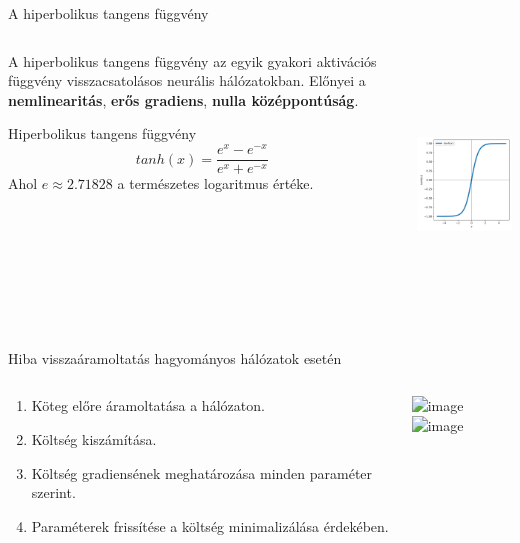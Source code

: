 \documentclass[english, aspectratio=169]{beamer}
\begin{document}
\begin{frame}{A hiperbolikus tangens függvény}
\begin{columns}
\begin{column}{.5\textwidth}
A hiperbolikus tangens függvény az egyik gyakori aktivációs függvény visszacsatolásos neurális hálózatokban. Előnyei a \textbf{nemlinearitás}, \textbf{erős gradiens}, \textbf{nulla középpontúság}. 
\begin{block}{Hiperbolikus tangens függvény}
\[
tanh(x) = \frac{e^x - e^{-x}}{e^x + e^{-x}}
\]
Ahol $e \approx 2.71828$ a természetes logaritmus értéke. 
\end{block}
\end{column}
\begin{column}{.5\textwidth}
\begin{center}
\includegraphics[height=7cm, width=7cm, keepaspectratio]{images/tanh.png}
\end{center}
\end{column}
\end{columns}
\end{frame}

\begin{frame}{Hiba visszaáramoltatás hagyományos hálózatok esetén}
\begin{columns}
\begin{column}{.4\textwidth}
\begin{enumerate}
	\item Köteg előre áramoltatása a hálózaton.
	\item Költség kiszámítása.
	\item Költség gradiensének meghatározása minden paraméter szerint. 
	\item Paraméterek frissítése a költség minimalizálása érdekében.
\end{enumerate}
\end{column}
\begin{column}{.7\textwidth}
\begin{center}
\includegraphics<1>[height=7cm, width=10cm, keepaspectratio]{graphs/recurrent_18.png}
\includegraphics<2>[height=7cm, width=10cm, keepaspectratio]{graphs/recurrent_9.png}
\end{center}
\end{column}
\end{columns}
\end{frame}
\end{document}
